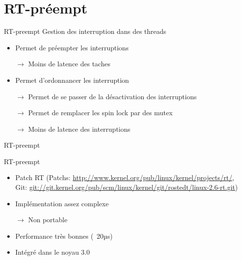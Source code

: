 \section{RT-préempt} %

\begin{frame}{RT-preempt} %
  Gestion des interruption dans des threads
  \begin{itemize}
    \item Permet de préempter les interruptions
    \item[$\to$] Moins de latence des taches
    \item Permet d'ordonnancer les interruption
    \item[$\to$] Permet de se passer de la désactivation des interruptions
    \item[$\to$] Permet de remplacer les spin lock par des mutex
    \item[$\to$] Moins de latence des interruptions
  \end{itemize}
\end{frame}

\begin{frame}{RT-preempt}
  \begin{center}
    
  \end{center}
\end{frame}

\begin{frame}{RT-preempt}
 \begin{itemize}
 \item                 Patch                RT                (Patchs:
   \url{http://www.kernel.org/pub/linux/kernel/projects/rt/},   Git:
   \url{git://git.kernel.org/pub/scm/linux/kernel/git/rostedt/linux-2.6-rt.git})
  \item Implémentation assez complexe
  \item[$\to$] Non portable
  \item Performance très bonnes (~20µs)
  \item Intégré dans le noyau 3.0
 \end{itemize}
\end{frame}
